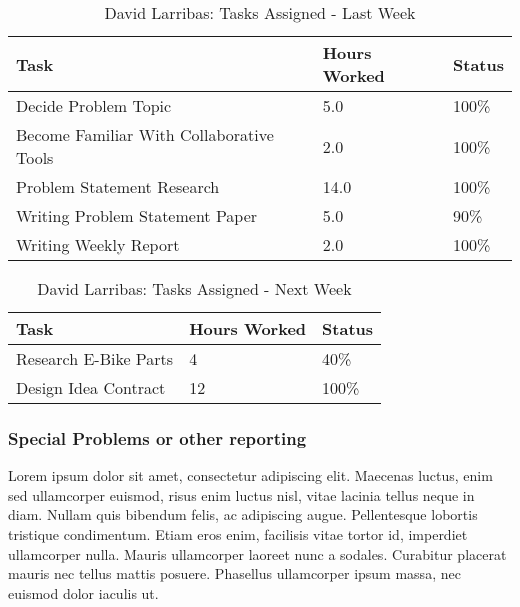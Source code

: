 \documentclass[12pt,article,compsoc]{IEEEtran}
\begin{document}
	\begin{table}[ht]
	\renewcommand{\arraystretch}{1.3}
		\caption{David Larribas: Tasks Assigned - Last Week}
		
		\label{Summary of David Larribas' activities: last week}
		
		\centering
		\begin{tabular}{p{5.5cm}|p{1cm}|p{1cm}}
		\hline
		\bfseries 	Task		 		& \bfseries Hours Worked	& \bfseries Status	\\
		\hline\hline
					Decide Problem Topic		& 5.0					& 100\%				\\	%
					Become Familiar With Collaborative Tools	& 2.0					& 100\%				\\
					Problem Statement Research	& 14.0					& 100\%				\\
					Writing Problem Statement Paper	& 5.0				& 90\%				\\
					Writing Weekly Report		& 2.0					& 100\%				\\	
		\hline
		\end{tabular}
	\end{table}

	\begin{table}[ht]
	\renewcommand{\arraystretch}{1.3}
		\caption{David Larribas: Tasks Assigned - Next Week}
		
		\label{Summary of David Larribas' activites: this week}
		
		\centering
		\begin{tabular}{p{5.5cm}|p{1cm}|p{1cm}}
		\hline

		\bfseries 	Task		 		& \bfseries Hours Worked	& \bfseries Status	\\
		\hline\hline
		
					Research E-Bike Parts
					& 4							&
					40\%				\\
					Design Idea Contract			& 12						& 100\%				\\	
		\hline
		\end{tabular}
	\end{table}

	\subsubsection*{Special Problems or other reporting}
	Lorem ipsum dolor sit amet, consectetur adipiscing elit. Maecenas luctus, enim sed ullamcorper euismod, risus enim luctus nisl, vitae lacinia tellus neque in diam. Nullam quis bibendum felis, ac adipiscing augue. Pellentesque lobortis tristique condimentum. Etiam eros enim, facilisis vitae tortor id, imperdiet ullamcorper nulla. Mauris ullamcorper laoreet nunc a sodales. Curabitur placerat mauris nec tellus mattis posuere. Phasellus ullamcorper ipsum massa, nec euismod dolor iaculis ut.
	\clearpage
\end{document}
